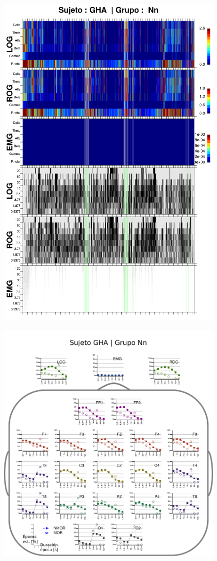 \begin{figure}
\centering
\includegraphics[width=0.9\linewidth]
{./img_resultados/GH24031950SUENO_combinado_.png} 
\end{figure}

\begin{figure}
\centering
\includegraphics[width=.9\linewidth]{./img_resultados/cabeza_GHA.pdf}
\end{figure}

